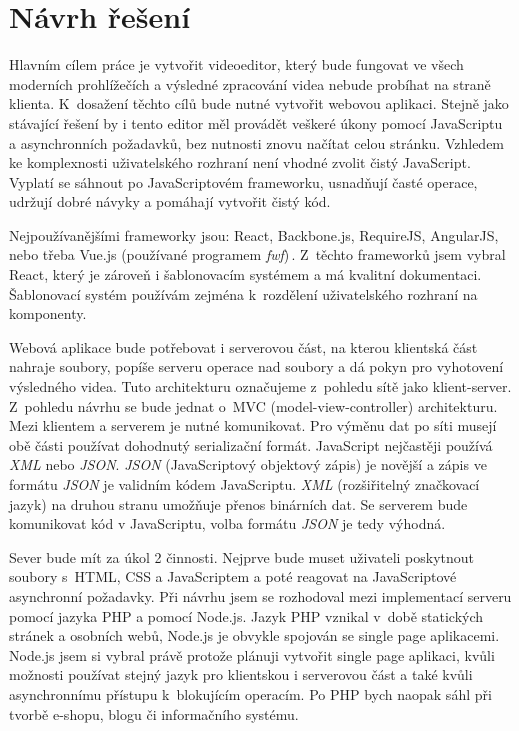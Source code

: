 \chapter{Návrh řešení}
Hlavním cílem práce je vytvořit videoeditor, který bude fungovat ve všech moderních prohlížečích a výsledné zpracování videa nebude probíhat na straně klienta. K~dosažení těchto cílů bude nutné vytvořit webovou aplikaci. Stejně jako stávající řešení by i tento editor měl provádět veškeré úkony pomocí JavaScriptu a asynchronních požadavků, bez nutnosti znovu načítat celou stránku. Vzhledem ke komplexnosti uživatelského rozhraní není vhodné zvolit čistý JavaScript. Vyplatí se sáhnout po JavaScriptovém frameworku, usnadňují časté operace, udržují dobré návyky a pomáhají vytvořit čistý kód.

Nejpoužívanějšími frameworky jsou: React, Backbone.js, RequireJS, AngularJS, nebo třeba Vue.js (používané programem \textit{fwf})\,\cite{WappalyzerJavasript}. Z~těchto frameworků jsem vybral React, který je zároveň i šablonovacím systémem a má kvalitní dokumentaci. Šablonovací systém používám zejména k~rozdělení uživatelského rozhraní na komponenty.

Webová aplikace bude potřebovat i serverovou část, na kterou klientská část nahraje soubory, popíše serveru operace nad soubory a dá pokyn pro vyhotovení výsledného videa. Tuto architekturu označujeme z~pohledu sítě jako klient-server. Z~pohledu návrhu se bude jednat o~MVC (model-view-controller) architekturu. Mezi klientem a serverem je nutné komunikovat. Pro výměnu dat po síti musejí obě části používat dohodnutý serializační formát. JavaScript nejčastěji používá \textit{XML} nebo \textit{JSON}. \textit{JSON} (JavaScriptový objektový zápis) je novější a zápis ve formátu \textit{JSON} je validním kódem JavaScriptu. \textit{XML} (rozšiřitelný značkovací jazyk) na druhou stranu umožňuje přenos binárních dat. Se serverem bude komunikovat kód v JavaScriptu, volba formátu \textit{JSON} je tedy výhodná.

Sever bude mít za úkol 2 činnosti. Nejprve bude muset uživateli poskytnout soubory s~HTML, CSS a JavaScriptem a poté reagovat na JavaScriptové asynchronní požadavky. Při návrhu jsem se rozhodoval mezi implementací serveru pomocí jazyka PHP a pomocí Node.js. Jazyk PHP vznikal v~době statických stránek a osobních webů, Node.js je obvykle spojován se single page aplikacemi. Node.js jsem si vybral právě protože plánuji vytvořit single page aplikaci, kvůli možnosti používat stejný jazyk pro klientskou i serverovou část a také kvůli asynchronnímu přístupu k~blokujícím operacím. Po PHP bych naopak sáhl při tvorbě e-shopu, blogu či informačního systému.


